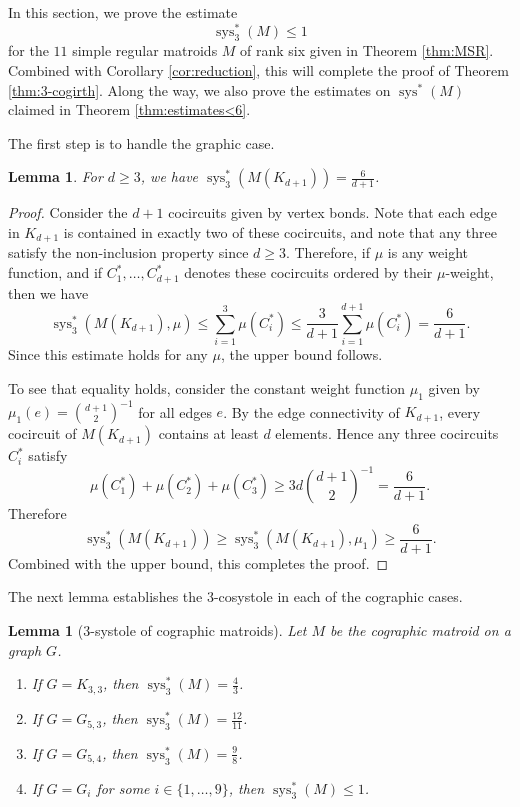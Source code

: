 \documentclass[reqno,12pt]{amsart}
\newtheorem{lemma}[theorem]{Lemma}
\numberwithin{theorem}{section}
\theoremstyle{plain}
\theoremstyle{definition}
\theoremstyle{remark}
\numberwithin{equation}{section}
\numberwithin{table}{section}
\DeclareMathOperator{\sys}{sys}
\begin{document}
In this section, we prove the estimate
    \[\sys_3^*(M) \leq 1\]
for the $11$ simple regular matroids $M$ of rank six given in Theorem \ref{thm:MSR}. Combined with Corollary \ref{cor:reduction}, this will complete the proof of Theorem \ref{thm:3-cogirth}. Along the way, we also prove the estimates on $\sys^*(M)$ claimed in Theorem \ref{thm:estimates<6}. 

The first step is to handle the graphic case.

\begin{lemma}\label{lem:3sys graph}%
For $d \geq 3$, we have $\sys_3^*(M(K_{d+1})) = \frac{6}{d+1}$.
\end{lemma}

\begin{proof}
Consider the $d + 1$ cocircuits given by vertex bonds. Note that each edge in $K_{d+1}$ is contained in exactly two of these cocircuits, and note that any three satisfy the non-inclusion property since $d \geq 3$. Therefore, if $\mu$ is any weight function, and if $C_1^*, \ldots, C_{d+1}^*$ denotes these cocircuits ordered by their $\mu$-weight, then we have
    \[\sys_3^*(M(K_{d+1}), \mu) \leq \sum_{i=1}^3 \mu(C_i^*) \leq \frac{3}{d+1} \sum_{i=1}^{d+1} \mu(C_i^*) = \frac{6}{d+1}.\]
Since this estimate holds for any $\mu$, the upper bound follows. 

To see that equality holds, consider the constant weight function $\mu_1$ given by $\mu_1(e) = \binom{d+1}{2}^{-1}$ for all edges $e$. By the edge connectivity of $K_{d+1}$, every cocircuit of $M(K_{d+1})$ contains at least $d$ elements. 
Hence any three cocircuits $C_i^*$ satisfy
    \[\mu(C_1^*) + \mu(C_2^*) + \mu(C_3^*) \geq 3d\binom{d+1}{2}^{-1} = \frac{6}{d+1}.\]
Therefore
    \[\sys_3^*(M(K_{d+1})) 
    \geq \sys_3^*(M(K_{d+1}), \mu_1) \geq  \frac{6}{d+1}.\] 
Combined with the upper bound, this completes the proof.
\end{proof}

The next lemma establishes the 3-cosystole in each of the cographic cases.

\begin{lemma}[$3$-systole of cographic matroids]\label{lem:3sys-cograph}
Let $M$ be the cographic matroid on a graph $G$.
    \begin{enumerate}
        \item If $G = K_{3,3}$, then $\sys_3^*(M) = \tfrac 4 3$.
        \item If $G = G_{5,3}$, then $\sys_3^*(M) = \tfrac{12}{11}$.
        \item If $G = G_{5,4}$, then $\sys_3^*(M) = \tfrac 9 8$.
        \item If $G = G_i$ for some $i \in \{1,\ldots,9\}$, then $\sys_3^*(M) \leq 1$.
    \end{enumerate}
\end{lemma}
\end{document}
